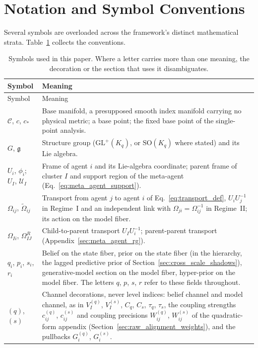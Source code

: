 \section{Notation and Symbol Conventions}\label{sec:notation}

Several symbols are overloaded across the framework's distinct mathematical strata. Table~\ref{tab:notation} collects the conventions.

{\small
\setlength{\LTcapwidth}{\textwidth}
\begin{longtable}{@{}p{}p{}@{}}
\caption{Symbols used in this paper. Where a letter carries more than one meaning, the decoration or the section that uses it disambiguates.}\label{tab:notation}\\
\toprule
Symbol & Meaning \\
\midrule
\endfirsthead
\toprule
Symbol & Meaning \\
\midrule
\endhead
\bottomrule
\endfoot
$\mathcal{C}$, $c$, $c_*$ & Base manifold, a presupposed smooth index manifold carrying no physical metric; a base point; the fixed base point of the single-point analysis. \\
$G$, $\mathfrak{g}$ & Structure group ($\mathrm{GL}^+(K_q)$, or $\mathrm{SO}(K_q)$ where stated) and its Lie algebra. \\
$U_i$, $\phi_i$; $U_I$, $\mathcal{U}_I$ & Frame of agent $i$ and its Lie-algebra coordinate; parent frame of cluster $I$ and support region of the meta-agent (Eq.~\eqref{eq:meta_agent_support}). \\
$\Omega_{ij}$, $\widetilde{\Omega}_{ij}$ & Transport from agent $j$ to agent $i$ of Eq.~\eqref{eq:transport_def}, $U_iU_j^{-1}$ in Regime~I and an independent link with $\Omega_{ji}=\Omega_{ij}^{-1}$ in Regime~II; its action on the model fiber. \\
$\Omega_{Ii}$, $\Omega_{IJ}^R$ & Child-to-parent transport $U_IU_i^{-1}$; parent-parent transport (Appendix~\ref{sec:meta_agent_rg}). \\
$q_i$, $p_i$, $s_i$, $r_i$ & Belief on the state fiber, prior on the state fiber (in the hierarchy, the lagged predictive prior of Section~\ref{sec:cross_scale_shadows}), generative-model section on the model fiber, hyper-prior on the model fiber. The letters $q$, $p$, $s$, $r$ refer to these fields throughout. \\
$(q)$, $(s)$ & Channel decorations, never level indices: belief channel and model channel, as in $V_I^{(q)}$, $V_I^{(s)}$, $C_q$, $C_s$, $\tau_q$, $\tau_s$, the coupling strengths $c^{(q)}_{ij}$, $c^{(s)}_{ij}$ and coupling precisions $W^{(q)}_{ij}$, $W^{(s)}_{ij}$ of the quadratic-form appendix (Section~\ref{sec:raw_alignment_weights}), and the pullbacks $G^{(q)}_i$, $G^{(s)}_i$. \\

\end{longtable}}
